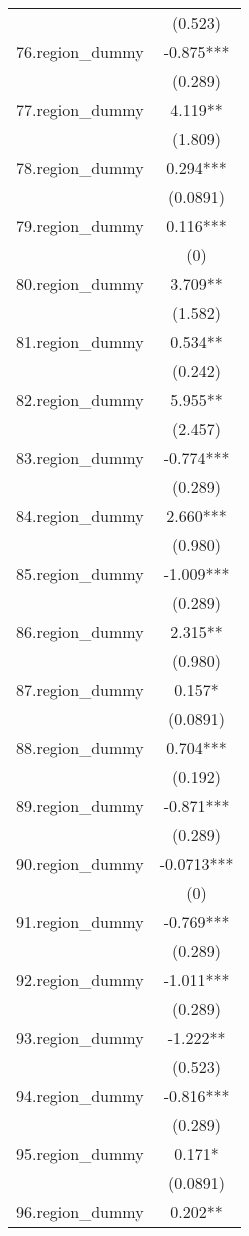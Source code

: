 \documentclass[]{article}
\begin{document}
\begin{tabular}{lc}
 & (0.523) \\
76.region\_dummy & -0.875*** \\
 & (0.289) \\
77.region\_dummy & 4.119** \\
 & (1.809) \\
78.region\_dummy & 0.294*** \\
 & (0.0891) \\
79.region\_dummy & 0.116*** \\
 & (0) \\
80.region\_dummy & 3.709** \\
 & (1.582) \\
81.region\_dummy & 0.534** \\
 & (0.242) \\
82.region\_dummy & 5.955** \\
 & (2.457) \\
83.region\_dummy & -0.774*** \\
 & (0.289) \\
84.region\_dummy & 2.660*** \\
 & (0.980) \\
85.region\_dummy & -1.009*** \\
 & (0.289) \\
86.region\_dummy & 2.315** \\
 & (0.980) \\
87.region\_dummy & 0.157* \\
 & (0.0891) \\
88.region\_dummy & 0.704*** \\
 & (0.192) \\
89.region\_dummy & -0.871*** \\
 & (0.289) \\
90.region\_dummy & -0.0713*** \\
 & (0) \\
91.region\_dummy & -0.769*** \\
 & (0.289) \\
92.region\_dummy & -1.011*** \\
 & (0.289) \\
93.region\_dummy & -1.222** \\
 & (0.523) \\
94.region\_dummy & -0.816*** \\
 & (0.289) \\
95.region\_dummy & 0.171* \\
 & (0.0891) \\
96.region\_dummy & 0.202** \\

\end{tabular}
\end{document}
